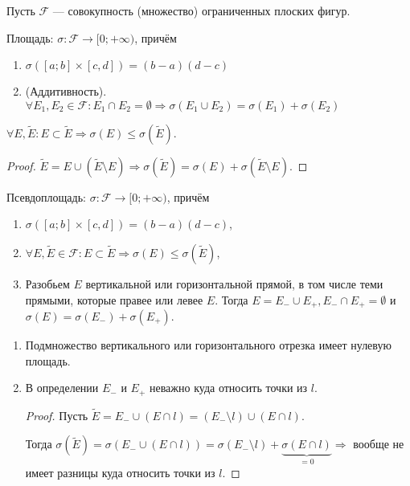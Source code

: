 Пусть $\mathcal{F}$ --- совокупность (множество) ограниченных плоских фигур. 
\begin{definition}
    Площадь: $\sigma\!: \mathcal{F} \to [0; +\infty)$, причём 
     \begin{enumerate}
         \item $\sigma([a; b] \times [c, d]) = (b - a)(d - c)$
         \item (Аддитивность).  $\forall E_1, E_2 \in \mathcal{F}\!: E_1 \cap E_2 = \emptyset \Rightarrow \sigma(E_1 \cup E_2) = \sigma(E_1) + \sigma(E_2)$
    \end{enumerate}
\end{definition}
\begin{property}
    $\forall E, \widetilde{E}\!: E \subset \widetilde{E} \Rightarrow \sigma(E) \le \sigma(\widetilde{E})$.
\end{property}
\begin{proof}
    $\widetilde{E} = E \cup (\widetilde{E} \setminus E) \Rightarrow \sigma(\widetilde{E}) = \sigma(E) + \sigma(\widetilde{E} \setminus E)$.
\end{proof}
\begin{definition}
    Псевдоплощадь: $\sigma\!: \mathcal{F} \to [0; +\infty)$, причём
     \begin{enumerate}
         \item $\sigma([a; b] \times [c, d]) = (b - a)(d - c)$,
         \item $\forall E, \widetilde{E} \in \mathcal{F}\!: E \subset \widetilde{E} \Rightarrow \sigma(E) \le \sigma(\widetilde{E})$, 
         \item Разобьем $E$ вертикальной или горизонтальной прямой, в том числе теми прямыми, которые правее или левее $E$. Тогда  $E = E_- \cup E_+, E_- \cap E_+ = \emptyset$ и  $\sigma(E) = \sigma(E_-) + \sigma(E_+)$.
    \end{enumerate}
\end{definition}
\begin{properties}
    \begin{enumerate}
        \item Подмножество вертикального или горизонтального отрезка имеет нулевую площадь.
        \item В определении $E_-$ и  $E_+$ неважно  куда относить точки из  $l$.
            \begin{proof}
            	Пусть $\widetilde{E} = E_- \cup (E \cap l) = (E_- \setminus l) \cup (E \cap l)$.
            	
            	Тогда $ \sigma(\widetilde{E}) = \sigma(E_- \cup (E \cap l)) = \sigma(E_- \setminus l) + \underbrace{\sigma(E \cap l)}_{=0} \Rightarrow$ вообще не имеет разницы куда относить точки из $l$.
            \end{proof}
    \end{enumerate}
\end{properties}
